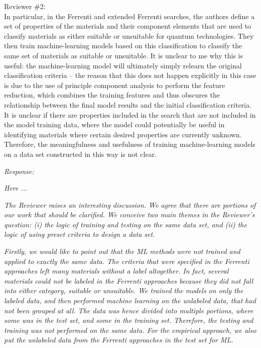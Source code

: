 \documentclass[11pt, a4paper]{letter} %
\begin{document}
Reviewer \#2: \\
In particular, in the Ferrenti and extended Ferrenti searches, the authors define a set of properties of the materials and their component elements that are used to classify materials as either suitable or unsuitable for quantum technologies. They then train machine-learning models based on this classification to classify the same set of materials as suitable or unsuitable. It is unclear to me why this is useful: the machine-learning model will ultimately simply relearn the original classification criteria – the reason that this does not happen explicitly in this case is due to the use of principle component analysis to perform the feature reduction, which combines the training features and thus obscures the relationship between the final model results and the initial classification criteria. It is unclear if there are properties included in the search that are not included in the model training data, where the model could potentially be useful in identifying materials
where certain desired properties are currently unknown. Therefore, the meaningfulness and usefulness of training machine-learning models on a data set constructed in this way is not clear.

\textit{Response:} 

\textit{Here ... }

\textit{The Reviewer raises an interesting discussion. We agree that there are portions of our work that should be clarified. We conceive two main themes in the Reviewer's question: (i) the logic of training and testing on the same data set, and (ii) the logic of using preset criteria to design a data set.} 

\textit{Firstly, we would like to point out that the ML methods were not trained and applied to exactly the same data. The criteria that were specified in the Ferrenti approaches left many materials without a label altogether. 
In fact, several materials could not be labeled in the Ferrenti approaches because they did not fall into either category, suitable or unsuitable. 
We trained the models on only the labeled data, and then performed machine learning on the unlabeled data, that had not been grouped at all. The data was hence divided into multiple portions, where some was in the test set, and some in the  training set. Therefore, the testing and training was not performed on the same data. For the empirical approach, we also put the unlabeled data from the Ferrenti approaches in the test set for ML.}
\end{document}
